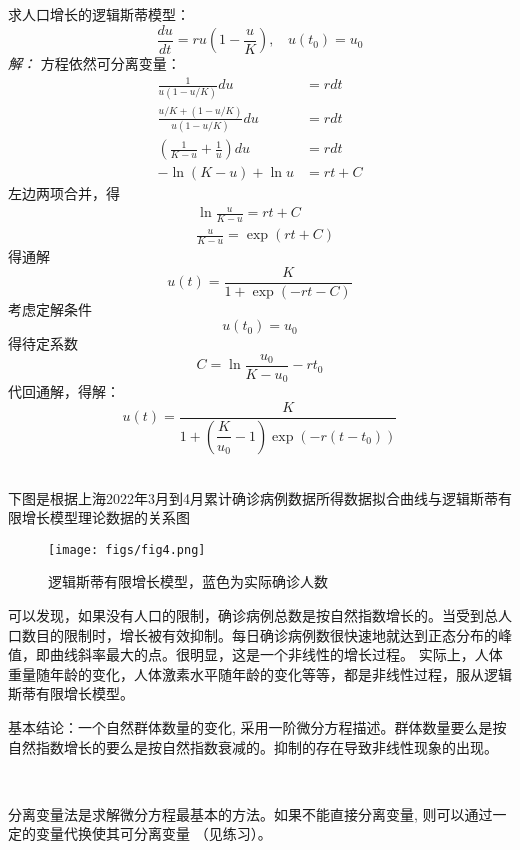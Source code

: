 	\begin{example} %
	求人口增长的逻辑斯蒂模型：
	\begin{equation*}
	\frac{du}{dt}	=  ru (1-\frac{u}{K}), ~~~~ u(t_0) = u_0
	\end{equation*}
	\emph{解：} 方程依然可分离变量：\\
	\begin{align*}
	\frac{1}{u(1-u / K)}du &=r d t \\
		\frac{u / K+(1-u / K)}{u(1-u / K)} d u &=r d t	\\
		(\frac{1}{K-u}+\frac{1}{u} ) d u &=r d t \\
		-\ln (K-u)+\ln u &=r t+C 
	\end{align*}
	左边两项合并，得
	\begin{align*}	
	&\ln \frac{u}{K-u}  =r t+C\\
	&\frac{u}{K-u} =\exp (r t+C)	
	\end{align*}
得通解
$$ u(t)  =\frac{K}{1+\exp (-r t-C)} $$			
 考虑定解条件$$u(t_0) =u_0 $$ 
得待定系数$$C=\ln \dfrac{u_0}{K-u_0} -r t_0$$
代回通解，得解：
\begin{equation*}
u(t)  =\dfrac{K}{1+(\dfrac{K}{u_0}-1)   \exp (-r (t-t_0))}	
\end{equation*}

\end{example}
~~\\
下图是根据上海2022年3月到4月累计确诊病例数据所得数据拟合曲线与逻辑斯蒂有限增长模型理论数据的关系图
\begin{figure}[h]
	\centering
	\texttt{[image: figs/fig4.png]}
	\caption{逻辑斯蒂有限增长模型，蓝色为实际确诊人数}
\end{figure}

可以发现，如果没有人口的限制，确诊病例总数是按自然指数增长的。当受到总人口数目的限制时，增长被有效抑制。每日确诊病例数很快速地就达到正态分布的峰值，即曲线斜率最大的点。很明显，这是一个非线性的增长过程。 实际上，人体重量随年龄的变化，人体激素水平随年龄的变化等等，都是非线性过程，服从逻辑斯蒂有限增长模型。

基本结论：一个自然群体数量的变化, 采用一阶微分方程描述。群体数量要么是按自然指数增长的要么是按自然指数衰减的。抑制的存在导致非线性现象的出现。

~~\\
\begin{hint}
分离变量法是求解微分方程最基本的方法。如果不能直接分离变量, 则可以通过一定的变量代换使其可分离变量 （见练习）。
\end{hint}

